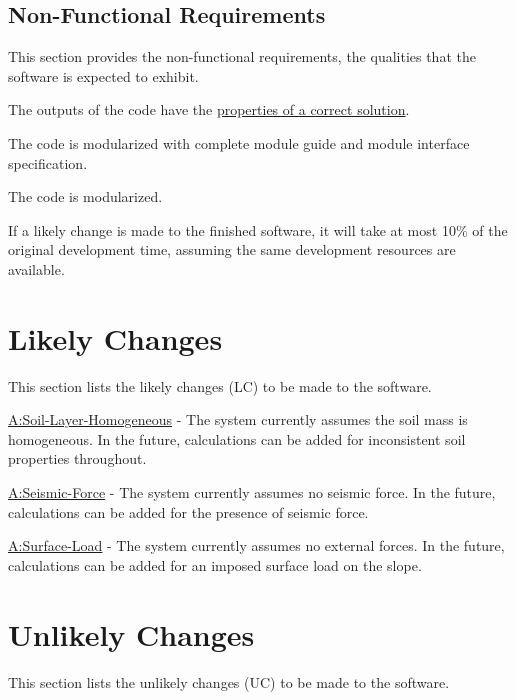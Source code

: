 \documentclass[12pt]{article}
\begin{document}
\subsection{Non-Functional Requirements}
\label{Sec:NFRs}
This section provides the non-functional requirements, the qualities that the software is expected to exhibit.

\begin{description}[font=\normalfont]
\item[Correctness:\phantomsection\label{correct}]{The outputs of the code have the \hyperref[Sec:CorSolProps]{properties of a correct solution}.}
\item[Understandability:\phantomsection\label{understandable}]{The code is modularized with complete module guide and module interface specification.}
\item[Reusability:\phantomsection\label{reusable}]{The code is modularized.}
\item[Maintainability:\phantomsection\label{maintainable}]{If a likely change is made to the finished software, it will take at most 10$\%$ of the original development time, assuming the same development resources are available.}
\end{description}
\section{Likely Changes}
\label{Sec:LCs}
This section lists the likely changes (LC) to be made to the software.

\begin{description}[font=\normalfont]
\item[Calculate-Inhomogeneous-Soil-Layers:\phantomsection\label{LC_inhomogeneous}]{\hyperref[assumpSLH]{A:Soil-Layer-Homogeneous} - The system currently assumes the soil mass is homogeneous. In the future, calculations can be added for inconsistent soil properties throughout.}
\item[Calculate-Seismic-Force:\phantomsection\label{LC_seismic}]{\hyperref[assumpSF]{A:Seismic-Force} - The system currently assumes no seismic force. In the future, calculations can be added for the presence of seismic force.}
\item[Calculate-External-Force:\phantomsection\label{LC_external}]{\hyperref[assumpSL]{A:Surface-Load} - The system currently assumes no external forces. In the future, calculations can be added for an imposed surface load on the slope.}
\end{description}
\section{Unlikely Changes}
\label{Sec:UCs}
This section lists the unlikely changes (UC) to be made to the software.
\end{document}

